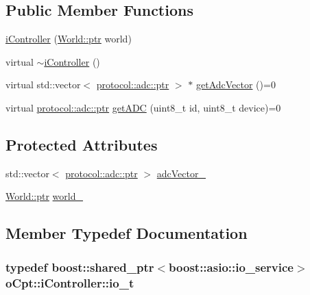 \subsection*{Public Member Functions}
\begin{DoxyCompactItemize}
\item 
\hyperlink{classo_cpt_1_1i_controller_acb46f6b610629978779f43e14b1c3f23}{i\+Controller} (\hyperlink{classo_cpt_1_1_world_aa6e591e3096d5de71e0cec9039663d67}{World\+::ptr} world)
\item 
virtual \hyperlink{classo_cpt_1_1i_controller_aa92cd99292abf1c093cd03420f44f6a0}{$\sim$i\+Controller} ()
\item 
virtual std\+::vector$<$ \hyperlink{classo_cpt_1_1protocol_1_1adc_a94af68cb9c573629a4a1a16f8ebd3dff}{protocol\+::adc\+::ptr} $>$ $\ast$ \hyperlink{classo_cpt_1_1i_controller_af414ebaf64b79ac45d1275e62799e36c}{get\+Adc\+Vector} ()=0
\item 
virtual \hyperlink{classo_cpt_1_1protocol_1_1adc_a94af68cb9c573629a4a1a16f8ebd3dff}{protocol\+::adc\+::ptr} \hyperlink{classo_cpt_1_1i_controller_a7abf65f5912df117a3ff4c1c9643bba3}{get\+A\+DC} (uint8\+\_\+t id, uint8\+\_\+t device)=0
\end{DoxyCompactItemize}
\subsection*{Protected Attributes}
\begin{DoxyCompactItemize}
\item 
std\+::vector$<$ \hyperlink{classo_cpt_1_1protocol_1_1adc_a94af68cb9c573629a4a1a16f8ebd3dff}{protocol\+::adc\+::ptr} $>$ \hyperlink{classo_cpt_1_1i_controller_ad385bb3078176cd3df8a9e51cfdab68a}{adc\+Vector\+\_\+}
\item 
\hyperlink{classo_cpt_1_1_world_aa6e591e3096d5de71e0cec9039663d67}{World\+::ptr} \hyperlink{classo_cpt_1_1i_controller_a77fe51158891ee7af9d5d92a3ff46b20}{world\+\_\+}
\end{DoxyCompactItemize}


\subsection{Member Typedef Documentation}
\subsubsection[{\texorpdfstring{io\+\_\+t}{io_t}}]{\setlength{\rightskip}{0pt plus 5cm}typedef boost\+::shared\+\_\+ptr$<$boost\+::asio\+::io\+\_\+service$>$ {\bf o\+Cpt\+::i\+Controller\+::io\+\_\+t}}\hypertarget{classo_cpt_1_1i_controller_a51c3436b03060209f6cd2ddce6df2d0c}{}\label{classo_cpt_1_1i_controller_a51c3436b03060209f6cd2ddce6df2d0c}
